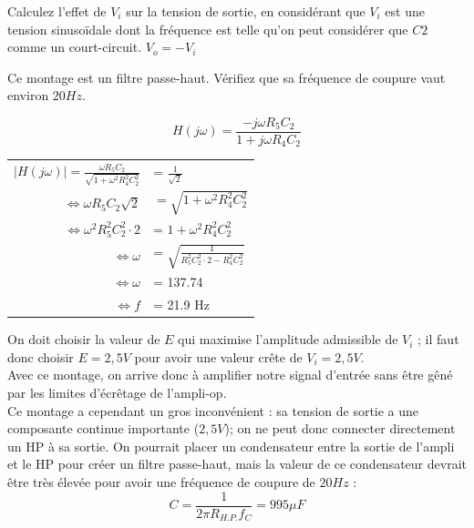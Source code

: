 {
Calculez l'effet de $V_i$ sur la tension de sortie, en considérant que $V_i$ est une tension sinusoïdale dont la fréquence est telle qu'on peut considérer que $C2$ comme un court-circuit.
}
{$V_o = -V_i$}

{
Ce montage est un filtre passe-haut. Vérifiez que sa fréquence de coupure vaut environ $20Hz$.
}
{
	$$H(j\omega) = \frac{-j\omega R_5 C_2}{1 + j\omega R_4 C_2}$$

	\begin{tabular}{rl}
		$|H(j\omega)| = \frac{\omega R_5 C_2}{\sqrt{1 + \omega^2 R_4^2 C_2^2}}$ &= $\frac{1}{\sqrt{2}}$ \\
		$\Leftrightarrow \omega R_5 C_2 \sqrt{2}$ &$=\sqrt{1 + \omega^2 R_4^2 C_2^2}$ \\
		$\Leftrightarrow \omega^2 R_5^2 C_2^2 \cdot 2$ &= $1 + \omega^2 R_4^2 C_2^2$ \\
		$\Leftrightarrow \omega$ &= $\sqrt{\frac{1}{R_5^2 C_2^2 \cdot 2 - R_4^2 C_2^2}}$\\
		$\Leftrightarrow \omega$ &= 137.74\\
		$\Leftrightarrow f$ &= 21.9 Hz
	\end{tabular}
}

On doit choisir la valeur de $E$ qui maximise l'amplitude admissible de $V_i$ ; il faut donc choisir $E = 2,5V$ pour avoir une valeur crête de $V_i = 2,5V$.\\
Avec ce montage, on arrive donc à amplifier notre signal d'entrée sans être gêné par les limites d'écrêtage de l'ampli-op.\\
Ce montage a cependant un gros inconvénient : sa tension de sortie a une composante continue importante ($2,5V$); on ne peut donc connecter directement un HP à sa sortie. On pourrait placer un condensateur entre la sortie de l'ampli et le HP pour créer un filtre passe-haut, mais la valeur de ce condensateur devrait être très élevée pour avoir une fréquence de coupure de $20Hz$ :
$$C=  \frac{1}{2 \pi R_{H.P.}f_C}=995\mu F$$

